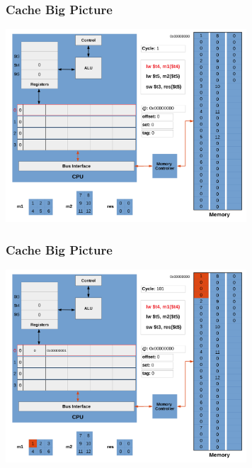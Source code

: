 \documentclass{beamer}
\begin{document}
\begin{frame}[fragile]
\frametitle{Cache Big Picture}

\begin{center}
\vspace*{-0.23cm}
\hspace*{-1cm}\includegraphics[width=9cm]{cache3.pdf}
\end{center}

\end{frame}

\begin{frame}[fragile]
\frametitle{Cache Big Picture}

\begin{center}
\vspace*{-0.23cm}
\hspace*{-1cm}\includegraphics[width=9cm]{cache4.pdf}
\end{center}

\end{frame}
\end{document}
